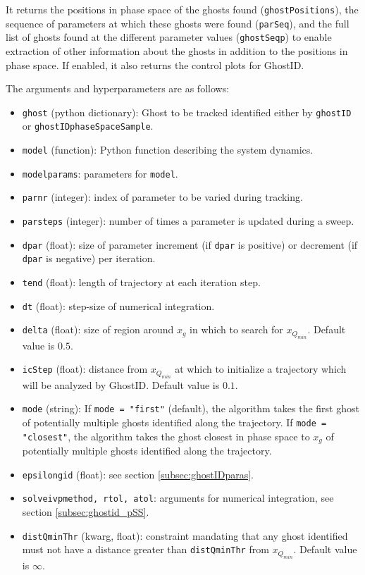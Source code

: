 \documentclass{article}
\theoremstyle{definition}
\begin{document}
\begin{refsection}
It returns the positions in phase space of the ghosts found ({\tt ghostPositions}), the sequence of parameters at which these ghosts were found ({\tt parSeq}), and the full list of ghosts found at the different parameter values ({\tt ghostSeq\textunderscore p}) to enable extraction of other information about the ghosts in addition to the positions in phase space. If enabled, it also returns the control plots for GhostID.

The arguments and hyperparameters are as follows:

\begin{itemize}
    \item {\tt ghost} (python dictionary): Ghost to be tracked identified either by {\tt ghostID} or {\tt ghostID\textunderscore phaseSpaceSample}.
    \item {\tt model} (function): Python function describing the system dynamics.
    \item {\tt model\textunderscore params}: parameters for {\tt model}.
    \item {\tt par\textunderscore nr} (integer): index of parameter to be varied during tracking.
    \item {\tt par\textunderscore steps} (integer): number of times a parameter is updated during a sweep.
    \item {\tt dpar} (float): size of parameter increment (if {\tt dpar} is positive) or decrement (if {\tt dpar} is negative) per iteration.
    \item {\tt t\textunderscore end} (float): length of trajectory at each iteration step.
    \item {\tt dt} (float): step-size of numerical integration.
    \item {\tt delta} (float): size of region around $x_g$ in which to search for $x_{Q_{min}}$. Default value is $0.5$.
    \item {\tt icStep} (float): distance from $x_{Q_{min}}$ at which to initialize a trajectory which will be analyzed by GhostID. Default value is $0.1$.
    \item {\tt mode} (string): If {\tt mode = "first"} (default), the algorithm takes the first ghost of potentially multiple ghosts identified along the trajectory. If {\tt mode = "closest"}, the algorithm takes the ghost closest in phase space to $x_g$ of potentially multiple ghosts identified along the trajectory.
    \item {\tt epsilon\textunderscore gid} (float): see section \ref{subsec:ghostIDparas}.
    \item {\tt solve\textunderscore ivp\textunderscore method, rtol, atol}: arguments for numerical integration, see section \ref{subsec:ghostid_pSS}.
    \item {\tt distQminThr} (kwarg, float): constraint mandating that any ghost identified must not have a distance greater than {\tt distQminThr} from $x_{Q_{min}}$. Default value is $\infty$.
\end{itemize}


\end{refsection}
\end{document}
